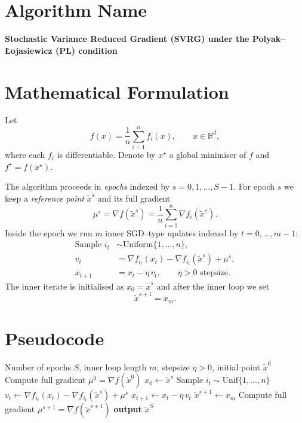 \documentclass{article}
\newcommand{\R}{\mathbb{R}}
\newcommand{\grad}{\nabla}
\begin{document}
\section*{Algorithm Name}
\textbf{Stochastic Variance Reduced Gradient (SVRG) under the Polyak–\L{}ojasiewicz (PL) condition}

\section*{Mathematical Formulation}
Let 
\[
f(x)=\frac{1}{n}\sum_{i=1}^{n} f_i(x),\qquad 
x\in\R^{d},
\]
where each $f_i$ is differentiable.  
Denote by $x^{\star}$ a global minimiser of $f$ and $f^{\star}=f(x^{\star})$.

\medskip
The algorithm proceeds in \emph{epochs} indexed by $s=0,1,\dots,S-1$.
For epoch $s$ we keep a \emph{reference point} $\tilde x^{s}$ and its full gradient
\[
\mu^{s}= \grad f(\tilde x^{s})=\frac1n\sum_{i=1}^{n}\grad f_i(\tilde x^{s}).
\]
Inside the epoch we run $m$ inner SGD–type updates indexed by $t=0,\dots,m-1$:
\begin{align}
\text{Sample } i_t &\sim \text{Uniform}\{1,\dots,n\}, \nonumber\\
v_t &= \grad f_{i_t}(x_t)-\grad f_{i_t}(\tilde x^{s})+\mu^{s}, \label{eq:vr}\\
x_{t+1} &= x_t-\eta\, v_t, \qquad \eta>0 \text{ stepsize}. \label{eq:update}
\end{align}
The inner iterate is initialised as $x_0=\tilde x^{s}$ and after the inner loop we set
\[
\tilde x^{s+1}=x_m .
\]

\section*{Pseudocode}
\begin{algorithm}[H]
\caption{SVRG with PL condition}
\begin{algorithmic}[1]
\Require Number of epochs $S$, inner loop length $m$, stepsize $\eta>0$, initial point $\tilde x^{0}$
\State Compute full gradient $\mu^{0}= \grad f(\tilde x^{0})$
    \State $x_0 \gets \tilde x^{s}$
        \State Sample $i_t\sim \text{Unif}\{1,\dots,n\}$
        \State $v_t \gets \grad f_{i_t}(x_t)-\grad f_{i_t}(\tilde x^{s})+\mu^{s}$ 
        \State $x_{t+1} \gets x_t-\eta\, v_t$ 
    \EndFor
    \State $\tilde x^{s+1}\gets x_m$
    \State Compute full gradient $\mu^{s+1}= \grad f(\tilde x^{s+1})$
\EndFor
\State \textbf{output} $\tilde x^{S}$
\end{algorithmic}
\end{algorithm}
\end{document}
